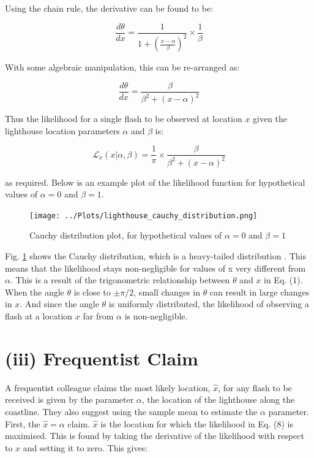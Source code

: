 \documentclass[12pt]{report} %
\begin{document}
Using the chain rule, the derivative can be found to be:

\begin{equation}
    \frac{d\theta}{dx} = \frac{1}{1 + \left(\frac{x - \alpha}{\beta}\right)^{2}} \times \frac{1}{\beta}
\end{equation}

With some algebraic manipulation, this can be re-arranged as:

\begin{equation}
    \frac{d\theta}{dx} = \frac{\beta}{\beta^{2} + (x - \alpha)^{2}}
\end{equation}

Thus the likelihood for a single flash to be observed at location $x$ given the lighthouse location parameters $\alpha$ and $\beta$ is:

\begin{equation}
    \mathcal{L}_{x}(x|\alpha, \beta) = \frac{1}{\pi} \times \frac{\beta}{\beta^{2} + (x - \alpha)^{2}}
\end{equation}

as required. Below is an example plot of the likelihood function for hypothetical values of $\alpha = 0$ and $\beta = 1$.

\begin{figure}[h]
\centering
\texttt{[image: ../Plots/lighthouse\_cauchy\_distribution.png]}
\caption{Cauchy distribution plot, for hypothetical values of $\alpha = 0$ and $\beta = 1$}
\label{fig:cauchy_distribution}
\end{figure}

Fig. \ref{fig:cauchy_distribution} shows the Cauchy distribution, which is a heavy-tailed distribution \cite[p34]{sivia_data_analysis} \cite[p84]{FJames2006}. This means that the likelihood stays non-negligible for values of x very different from $\alpha$. This is a result of the trigonometric relationship between $\theta$ and $x$ in Eq. (1). When the angle $\theta$ is close to $\pm \pi/2$, small changes in $\theta$ can result in large changes in $x$. And since the angle $\theta$ is uniformly distributed, the likelihood of observing a flash at a location $x$ far from $\alpha$ is non-negligible.

\chapter{(iii) Frequentist Claim}

A frequentist colleague claims the most likely location, $\hat{x}$, for any flash to be received is given by the parameter $\alpha$, the location of the lighthouse along the coastline. They also suggest using the sample mean to estimate the $\alpha$ parameter. First, the $\hat{x} = \alpha$ claim. $\hat{x}$ is the location for which the likelihood in Eq. (8) is maximised. This is found by taking the derivative of the likelihood with respect to $x$ and setting it to zero. This gives:
\end{document}
